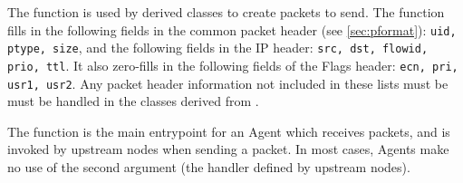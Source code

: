 The  function is used by derived classes to create
packets to send.
The function fills in the following fields in the common packet
header (see \ref{sec:pformat}): {\tt uid, ptype, size}, and the
following fields in the IP header: {\tt src, dst, flowid, prio, ttl}.
It also zero-fills in the following fields of the Flags header:
{\tt ecn, pri, usr1, usr2}.
Any packet header information not included in these lists must
be must be handled in the classes derived from .

The  function is the main entrypoint for an
Agent which receives packets, and
is invoked by upstream nodes when sending a packet.
In most cases, Agents make no use of the second argument (the handler
defined by upstream nodes).

\section{}

